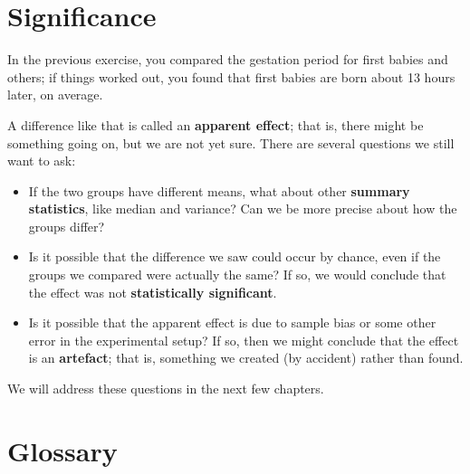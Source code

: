 \documentclass[10pt]{book}
\begin{document}
\section{Significance}

In the previous exercise, you compared the gestation period for first
babies and others; if things worked out, you found that first
babies are born about 13 hours later, on average.

A difference like that is called an {\bf apparent effect}; that is,
there might be something going on, but we are not yet sure.  There are
several questions we still want to ask:

\begin{itemize}

\item If the two groups have different means, what about other {\bf
  summary statistics}, like median and variance?  Can we be more
  precise about how the groups differ?

\item Is it possible that the difference we saw could occur by chance,
  even if the groups we compared were actually the same?  If so,
  we would conclude that the effect was not {\bf statistically
    significant}.

\item Is it possible that the apparent effect is due to sample bias or
  some other error in the experimental setup?  If so, then we might
  conclude that the effect is an {\bf artefact}; that is, something we
  created (by accident) rather than found. 

\end{itemize}

We will address these questions in the next few chapters.

\section{Glossary}
\end{document}
